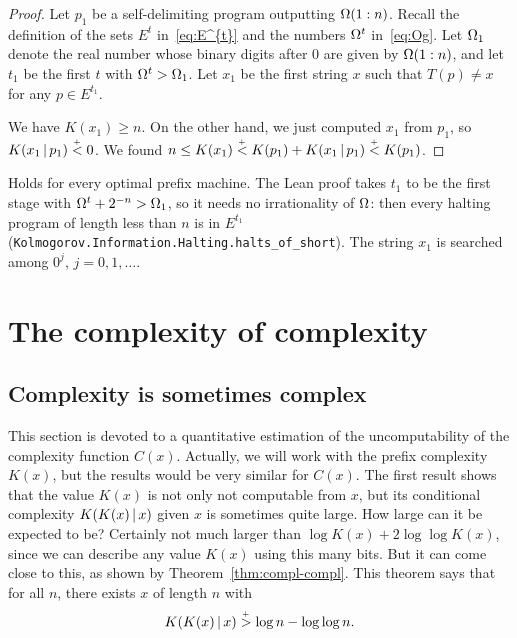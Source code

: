  \begin{proof}
  \leanok
Let \( p_{1} \) be a self-delimiting program outputting \( \Omega(1:n) \).
Recall the definition of the sets \( E^{t} \) in~\eqref{eq:E^{t}}
and the numbers \( \Omega^{t} \) in~\eqref{eq:Og}.
Let \( \Omega_{1} \) denote the real number whose binary digits after 0 are given
by \( \Omega(1:n) \), and let \( t_{1} \) be the first \( t \) with \( \Omega^{t}>\Omega_{1} \).
Let \( x_{1} \) be the first string \( x \) such that \( T(p)\ne x \) for any
\( p\in E^{t_{1}} \).

We have \( K(x_{1})\ge n \).
On the other hand, we just computed \( x_{1} \) from \( p_{1} \), so
\( K(x_{1}\,\vert\, p_{1})\stackrel{{}_+}{<} 0 \).
We found \( n \le K(x_{1}) \stackrel{{}_+}{<} K(p_{1}) + K(x_{1}\,\vert\, p_{1}) \stackrel{{}_+}{<} K(p_{1}) \).
 \end{proof}

\begin{formalization}
Holds for every optimal prefix machine. The Lean proof takes \( t_{1} \) to be the first stage
with \( \Omega^{t} + 2^{-n} > \Omega_{1} \), so it needs no irrationality of \( \Omega \): then every
halting program of length less than \( n \) is in \( E^{t_{1}} \)
(\texttt{Kolmogorov.Information.Halting.halts\_of\_short}). The string \( x_{1} \) is searched
among \( 0^{j} \), \( j = 0, 1, \dotsc \).
\end{formalization}


\section{The complexity of complexity}\label{sec:compl-compl}

\subsection{Complexity is sometimes complex}

This section is devoted to a quantitative estimation of the uncomputability
of the complexity function \( C(x) \).
Actually, we will work with the prefix complexity \( K(x) \), but the results
would be very similar for \( C(x) \).
The first result shows that the value
\( K(x) \) is not only not computable from \( x \), but
its conditional complexity \( K(K(x) \,\vert\, x) \) given \( x \) is sometimes quite
large.
How large can it be expected to be?
Certainly not much larger than \( \log K(x) + 2\log\log K(x) \), since we can
describe any value \( K(x) \) using this many bits.
But it can come close to this, as shown by Theorem~\ref{thm:compl-compl}.
This theorem says that for all \( n \), there exists \( x \) of length \( n \) with
 \begin{equation}\label{eq:compl-compl}
  K(K(x) \,\vert\, x) \stackrel{{}_+}{>} \log n - \log \log n.
 \end{equation}

